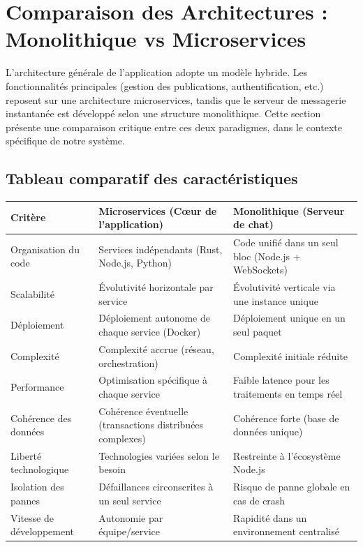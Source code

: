 \documentclass{rapportPfe}
\begin{document}
\section{Comparaison des Architectures : Monolithique vs Microservices}

L’architecture générale de l’application adopte un modèle hybride. Les fonctionnalités principales (gestion des publications, authentification, etc.) reposent sur une architecture microservices, tandis que le serveur de messagerie instantanée est développé selon une structure monolithique. Cette section présente une comparaison critique entre ces deux paradigmes, dans le contexte spécifique de notre système.

\subsection{Tableau comparatif des caractéristiques}

\begin{center}
\begin{tabular}{|p{4cm}|p{5.5cm}|p{5.5cm}|}
\hline
\textbf{Critère} & \textbf{Microservices (Cœur de l'application)} & \textbf{Monolithique (Serveur de chat)} \\
\hline
Organisation du code & Services indépendants (Rust, Node.js, Python) & Code unifié dans un seul bloc (Node.js + WebSockets) \\
\hline
Scalabilité & Évolutivité horizontale par service & Évolutivité verticale via une instance unique \\
\hline
Déploiement & Déploiement autonome de chaque service (Docker) & Déploiement unique en un seul paquet \\
\hline
Complexité & Complexité accrue (réseau, orchestration) & Complexité initiale réduite \\
\hline
Performance & Optimisation spécifique à chaque service & Faible latence pour les traitements en temps réel \\
\hline
Cohérence des données & Cohérence éventuelle (transactions distribuées complexes) & Cohérence forte (base de données unique) \\
\hline
Liberté technologique & Technologies variées selon le besoin & Restreinte à l’écosystème Node.js \\
\hline
Isolation des pannes & Défaillances circonscrites à un seul service & Risque de panne globale en cas de crash \\
\hline
Vitesse de développement & Autonomie par équipe/service & Rapidité dans un environnement centralisé \\
\hline
\end{tabular}
\end{center}
\end{document}
